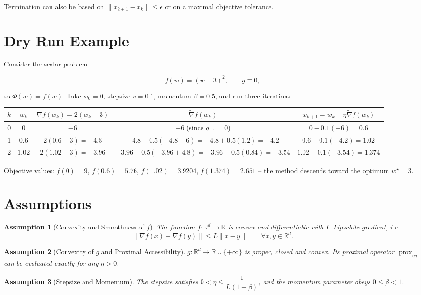 \documentclass{article}
\newtheorem{assumption}{Assumption}
\newcommand{\prox}{\operatorname{prox}}
\begin{document}
Termination can also be based on $\|x_{k+1}-x_k\|\le\epsilon$ or on a maximal objective tolerance.

\section*{Dry Run Example}
Consider the scalar problem  

\[
f(w)=(w-3)^{2},\qquad g\equiv0,
\]

so $\Phi(w)=f(w)$.  
Take $w_0=0$, stepsize $\eta=0.1$, momentum $\beta=0.5$, and run three iterations.

\begin{center}
\begin{tabular}{c|c|c|c|c}
$k$ & $w_k$ & $\nabla f(w_k)=2(w_k-3)$ & $\tilde\nabla f(w_k)$ & $w_{k+1}=w_k-\eta\tilde\nabla f(w_k)$ \\ \hline
0 & $0$ & $-6$ & $-6$ (since $g_{-1}=0$) & $0-0.1(-6)=0.6$ \\[2mm]
1 & $0.6$ & $2(0.6-3)=-4.8$ & $-4.8+0.5(-4.8+6)=-4.8+0.5(1.2)=-4.2$ & $0.6-0.1(-4.2)=1.02$ \\[2mm]
2 & $1.02$ & $2(1.02-3)=-3.96$ & $-3.96+0.5(-3.96+4.8)=-3.96+0.5(0.84)=-3.54$ & $1.02-0.1(-3.54)=1.374$ 
\end{tabular}
\end{center}

Objective values: $f(0)=9$, $f(0.6)=5.76$, $f(1.02)=3.9204$, $f(1.374)=2.651$ – the method descends toward the optimum $w^\star=3$.

\section*{Assumptions}
\begin{assumption}[Convexity and Smoothness of $f$]
\label{as:convex_smooth}
The function $f:\mathbb R^{d}\to\mathbb R$ is convex and differentiable with $L$‑Lipschitz gradient, i.e.
\[
\|\nabla f(x)-\nabla f(y)\|\le L\|x-y\|\qquad\forall x,y\in\mathbb R^{d}.
\]
\end{assumption}
\begin{assumption}[Convexity of $g$ and Proximal Accessibility]
\label{as:g}
$g:\mathbb R^{d}\to\mathbb R\cup\{+\infty\}$ is proper, closed and convex. Its proximal operator $\prox_{\eta g}$ can be evaluated exactly for any $\eta>0$.
\end{assumption}
\begin{assumption}[Stepsize and Momentum]
\label{as:params}
The stepsize satisfies $0<\eta\le \dfrac{1}{L(1+\beta)}$, and the momentum parameter obeys $0\le\beta<1$.
\end{assumption}
\end{document}
